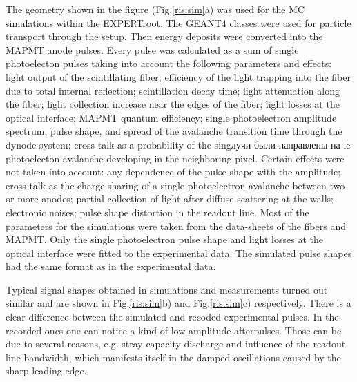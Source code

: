 \documentclass{webofc}
\newcommand{\er}{\textmd{EXPERTroot}}
\begin{document}
The geometry shown in the figure (Fig.\ref{ris:sim}a) was used for the MC simulations within the \er. The GEANT4\cite{geant4} classes were used for particle transport through the setup. Then energy deposits were  converted into the MAPMT anode pulses. Every pulse was calculated as a sum of single photoelecton pulses taking into account the following parameters and effects: light output of the scintillating fiber; efficiency of the light trapping into the fiber due to total internal reflection; scintillation decay time; light attenuation along the fiber; light collection increase near the edges of the fiber; light losses at the optical interface; MAPMT quantum efficiency; single photoelectron amplitude spectrum, pulse shape, and spread of the avalanche transition time through the dynode system; cross-talk as a probability of the singлучи были направлены на le photoelecton avalanche developing in the neighboring pixel.
Certain effects were not taken into account: any dependence of the pulse shape with the amplitude; cross-talk as the charge sharing of a single photoelectron avalanche between two or more anodes; partial collection of light after diffuse scattering at the walls; electronic noises; pulse shape distortion in the readout line. Most of the parameters for the simulations were taken from the data-sheets of the fibers and MAPMT.  Only the single photoelectron pulse shape and light losses at the optical interface were fitted to the experimental data. The simulated pulse shapes had the same format as in the experimental data.

Typical signal shapes obtained in simulations and measurements turned out similar and are shown in Fig.\ref{ris:sim}b) and Fig.\ref{ris:sim}c) respectively. There is a clear difference between the simulated and recoded experimental pulses. In the recorded ones one can notice a kind of low-amplitude afterpulses.  Those can be due to several reasons, e.g. stray capacity discharge and influence of the readout line bandwidth, which manifests itself in the damped oscillations caused by the sharp leading edge.
\end{document}
